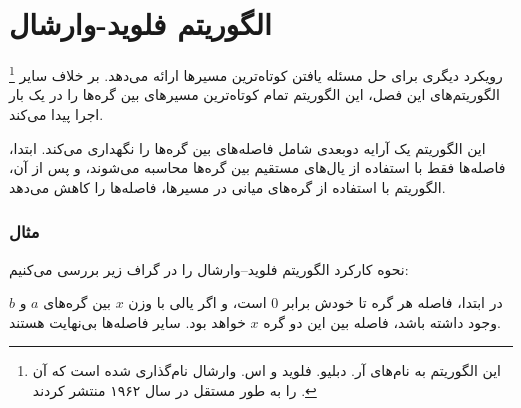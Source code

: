 \section{الگوریتم فلوید-وارشال}


\footnote{این الگوریتم به نام‌های آر. دبلیو. فلوید و اس. وارشال نام‌گذاری شده است که آن را به طور مستقل در سال ۱۹۶۲ منتشر کردند \cite{flo62,war62}.} رویکرد دیگری برای حل مسئله یافتن کوتاه‌ترین مسیرها ارائه می‌دهد. بر خلاف سایر الگوریتم‌های این فصل، این الگوریتم تمام کوتاه‌ترین مسیرهای بین گره‌ها را در یک بار اجرا پیدا می‌کند.

این الگوریتم یک آرایه دو‌بعدی شامل فاصله‌های بین گره‌ها را نگهداری می‌کند. ابتدا، فاصله‌ها فقط با استفاده از یال‌های مستقیم بین گره‌ها محاسبه می‌شوند، و پس از آن، الگوریتم با استفاده از گره‌های میانی در مسیرها، فاصله‌ها را کاهش می‌دهد.

\subsubsection{مثال}

نحوه کارکرد الگوریتم فلوید–وارشال را در گراف زیر بررسی می‌کنیم:

\begin{center}
\end{center}

در ابتدا، فاصله هر گره تا خودش برابر $0$ است، و اگر یالی با وزن $x$ بین گره‌های $a$ و $b$ وجود داشته باشد، فاصله بین این دو گره $x$ خواهد بود. سایر فاصله‌ها بی‌نهایت هستند.

